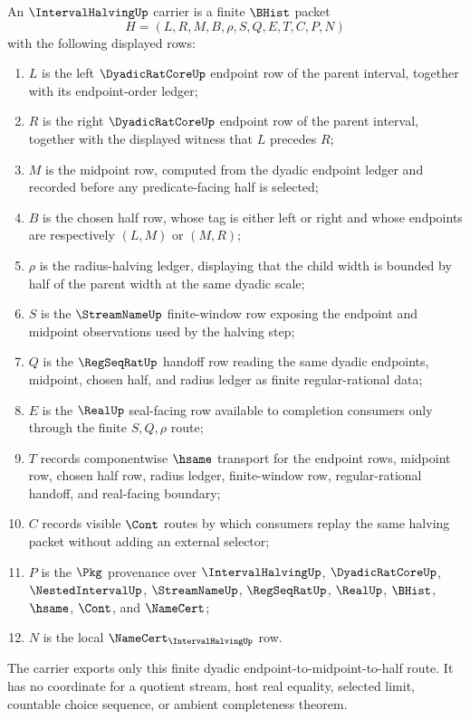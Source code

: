 \begin{definition}
\label{def:interval-halving-carrier}
An $\IntervalHalvingUp$ carrier is a finite $\BHist$ packet
$$
H=(L,R,M,B,\rho,S,Q,E,T,C,P,N)
$$
with the following displayed rows:
\begin{enumerate}
\item $L$ is the left $\DyadicRatCoreUp$ endpoint row of the parent interval, together with its endpoint-order ledger;
\item $R$ is the right $\DyadicRatCoreUp$ endpoint row of the parent interval, together with the displayed witness that $L$ precedes $R$;
\item $M$ is the midpoint row, computed from the dyadic endpoint ledger and recorded before any predicate-facing half is selected;
\item $B$ is the chosen half row, whose tag is either left or right and whose endpoints are respectively $(L,M)$ or $(M,R)$;
\item $\rho$ is the radius-halving ledger, displaying that the child width is bounded by half of the parent width at the same dyadic scale;
\item $S$ is the $\StreamNameUp$ finite-window row exposing the endpoint and midpoint observations used by the halving step;
\item $Q$ is the $\RegSeqRatUp$ handoff row reading the same dyadic endpoints, midpoint, chosen half, and radius ledger as finite regular-rational data;
\item $E$ is the $\RealUp$ seal-facing row available to completion consumers only through the finite $S,Q,\rho$ route;
\item $T$ records componentwise $\hsame$ transport for the endpoint rows, midpoint row, chosen half row, radius ledger, finite-window row, regular-rational handoff, and real-facing boundary;
\item $C$ records visible $\Cont$ routes by which consumers replay the same halving packet without adding an external selector;
\item $P$ is the $\Pkg$ provenance over $\IntervalHalvingUp$, $\DyadicRatCoreUp$, $\NestedIntervalUp$, $\StreamNameUp$, $\RegSeqRatUp$, $\RealUp$, $\BHist$, $\hsame$, $\Cont$, and $\NameCert$;
\item $N$ is the local $\NameCert_{\IntervalHalvingUp}$ row.
\end{enumerate}
The carrier exports only this finite dyadic endpoint-to-midpoint-to-half route. It has no coordinate for a quotient stream, host real equality, selected limit, countable choice sequence, or ambient completeness theorem.
\end{definition}

